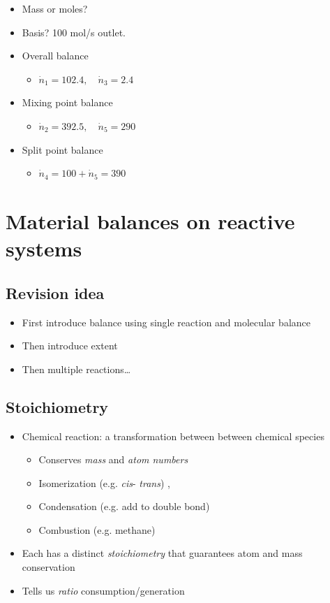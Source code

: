 \documentclass[11pt]{article}
\begin{document}
\begin{itemize}
\item Mass or moles?
\item Basis? 100 mol/s outlet.
\item Overall balance
\begin{itemize}
\item \(\dot{n}_{1} = 102.4,\quad\dot{n}_{3} = 2.4\)
\end{itemize}
\item Mixing point balance
\begin{itemize}
\item \(\dot{n}_{2} = 392.5,\quad\dot{n}_{5}=290\)
\end{itemize}
\item Split point balance
\begin{itemize}
\item \(\dot{n}_{4} = 100 + \dot{n}_{5} = 390\)
\end{itemize}
\end{itemize}
\newpage

\section{Material balances on reactive systems}
\label{sec-6}
\subsection{Revision idea}
\label{sec-6-1}
\begin{itemize}
\item First introduce balance using single reaction and molecular balance
\item Then introduce extent
\item Then multiple reactions\ldots{}
\end{itemize}
\subsection{Stoichiometry}
\label{sec-6-2}
\begin{itemize}
\item Chemical reaction: a transformation between between chemical species
\begin{itemize}
\item Conserves \emph{mass} and \emph{atom numbers}
\item Isomerization (e.g. \emph{cis}- \emph{trans}) ,
\item Condensation (e.g. add  to double bond) 
\item Combustion (e.g. methane) 
\end{itemize}
\item Each has a distinct \emph{stoichiometry} that guarantees atom and mass conservation
\item Tells us \emph{ratio} consumption/generation
\end{itemize}
\end{document}
